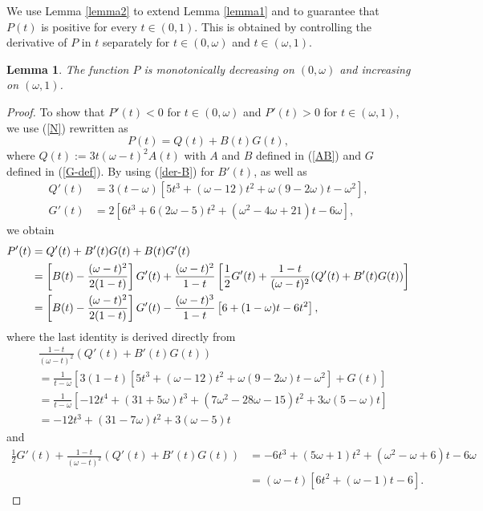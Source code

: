 \documentclass[12pt,reqno]{amsart}
\numberwithin{equation}{section}
\numberwithin{figure}{section}
\newtheorem{lemma}[theorem]{Lemma}
\begin{document}
We use Lemma \ref{lemma2} to extend Lemma \ref{lemma1} and to guarantee that $P(t)$ is positive for every $t \in (0,1)$. This is obtained by controlling the derivative of $P$ in $t$ separately for $t \in (0,\omega)$ and $t \in (\omega,1)$.


\begin{lemma}\label{lemma3}
	The function $P$ is monotonically decreasing on $(0,\omega)$ and  increasing on $(\omega,1)$. 
\end{lemma}
	
	\begin{proof}
To show that $P'(t) < 0$ for $t \in (0,\omega)$ and $P'(t) > 0$ for $t \in (\omega, 1)$, we use (\ref{N}) rewritten as 
		\begin{equation*}
		P(t) = Q(t) + B(t) G(t), 
		\end{equation*}
where $Q(t) := 3 t (\omega - t)^2 A(t)$ with $A$ and $B$ defined in (\ref{AB}) and $G$ defined in (\ref{G-def}). By using (\ref{der-B}) for $B'(t)$, as well as  
\begin{align*}
Q'(t) &=3(t-\omega) \left[ 5t^3+(\omega-12)t^2+ \omega (9-2\omega) t-\omega^2 \right], \\
G'(t) &= 2 \left[ 6 t^3 + 6 (2\omega - 5) t^2 + (\omega^2 - 4 \omega + 21) t - 6\omega \right],  
\end{align*}
we obtain 	
\begin{align}
P'(t) &= Q'(t) + B'(t)G(t) + B(t)G'(t)  \notag \\
&= \left[ B(t) - \frac{(\omega-t)^2}{2(1-t)} \right] G'(t) + \frac{(\omega-t)^2}{1-t} \left[ \frac{1}{2} G'(t) + \frac{1-t}{(\omega - t)^2} (Q'(t) + B'(t) G(t)) \right] \notag \\
&= \left[ B(t) - \frac{(\omega-t)^2}{2(1-t)} \right ]G'(t) -\frac{(\omega-t)^3}{1-t} \left[ 6 + (1-\omega) t - 6t^2 \right], \label{Pprime}
\end{align}
where the last identity is derived directly from 
\begin{align*}
& \frac{1-t}{(\omega - t)^2} (Q'(t) + B'(t) G(t)) \\
&= 
\frac{1}{t - \omega} \left[ 3 (1-t) \left[ 5t^3+(\omega-12)t^2+ \omega (9-2\omega) t-\omega^2 \right] + G(t) \right]  \\
&= \frac{1}{t - \omega} \left[ -12 t^4 + (31 + 5 \omega) t^3 + (7 \omega^2 - 28 \omega - 15) t^2 + 3 \omega (5 - \omega) t \right] \\
&= -12 t^3 + (31 - 7 \omega) t^2 + 3 (\omega - 5) t 
\end{align*}
and
\begin{align*}
\frac{1}{2} G'(t) + \frac{1-t}{(\omega - t)^2} (Q'(t) + B'(t) G(t))
&= -6 t^3 + (5 \omega + 1) t^2 + (\omega^2 - \omega + 6) t - 6\omega \\
&= (\omega - t) \left[ 6 t^2 + (\omega - 1) t - 6 \right].
\end{align*}


\end{proof}
\end{document}
